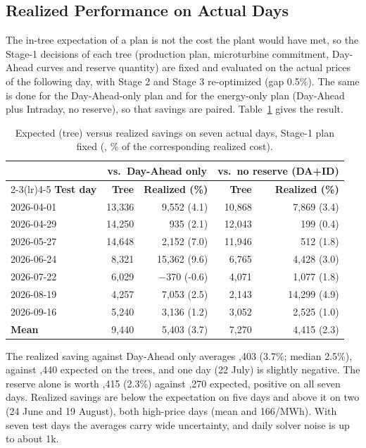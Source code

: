 \documentclass[journal]{IEEEtran}
\begin{document}
\subsection{Realized Performance on Actual Days}
The in-tree expectation of a plan is not the cost the plant would have met, so the Stage-1 decisions of each tree (production plan, microturbine commitment, Day-Ahead curves and reserve quantity) are fixed and evaluated on the actual prices of the following day, with Stage 2 and Stage 3 re-optimized (gap 0.5\%). The same is done for the Day-Ahead-only plan and for the energy-only plan (Day-Ahead plus Intraday, no reserve), so that savings are paired. Table~\ref{tab:realized} gives the result.

\begin{table}[t]
\caption{Expected (tree) versus realized savings on seven actual days, Stage-1 plan fixed (\texteuro, \% of the corresponding realized cost).}
\label{tab:realized}
\centering
\scriptsize
\setlength{\tabcolsep}{2.5pt}
\begin{tabular}{@{}lrrrr@{}}
\toprule
 & \multicolumn{2}{c}{\textbf{vs.\ Day-Ahead only}} & \multicolumn{2}{c}{\textbf{vs.\ no reserve (DA+ID)}} \\
\cmidrule(lr){2-3}\cmidrule(lr){4-5}
\textbf{Test day} & \textbf{Tree} & \textbf{Realized (\%)} & \textbf{Tree} & \textbf{Realized (\%)} \\
\midrule
2026-04-01 & 13,336 & 9,552 (4.1) & 10,868 & 7,869 (3.4) \\
2026-04-29 & 14,250 & 935 (2.1) & 12,043 & 199 (0.4) \\
2026-05-27 & 14,648 & 2,152 (7.0) & 11,946 & 512 (1.8) \\
2026-06-24 & 8,321 & 15,362 (9.6) & 6,765 & 4,428 (3.0) \\
2026-07-22 & 6,029 & $-$370 (-0.6) & 4,071 & 1,077 (1.8) \\
2026-08-19 & 4,257 & 7,053 (2.5) & 2,143 & 14,299 (4.9) \\
2026-09-16 & 5,240 & 3,136 (1.2) & 3,052 & 2,525 (1.0) \\
\midrule
\textbf{Mean} & 9,440 & 5,403 (3.7) & 7,270 & 4,415 (2.3) \\
\bottomrule
\end{tabular}
\end{table}

The realized saving against Day-Ahead only averages ,403 (3.7\%; median 2.5\%), against ,440 expected on the trees, and one day (22 July) is slightly negative. The reserve alone is worth ,415 (2.3\%) against ,270 expected, positive on all seven days. Realized savings are below the expectation on five days and above it on two (24 June and 19 August), both high-price days (mean  and 166/MWh). With seven test days the averages carry wide uncertainty, and daily solver noise is up to about \texteuro 1k.
\end{document}
